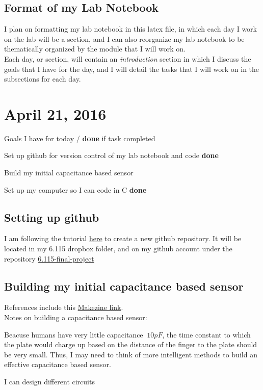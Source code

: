 \documentclass[12pt,twoside]{article}
\newenvironment{tight_enumerate}{
\begin{enumerate}
  \setlength{\itemsep}{0pt}
  \setlength{\parskip}{0pt}
}{\end{enumerate}}
\newenvironment{tight_itemize}{
\begin{itemize}
  \setlength{\itemsep}{0pt}
  \setlength{\parskip}{0pt}
}{\end{itemize}}
\begin{document}
\subsection{Format of my Lab Notebook}
I plan on formatting my lab notebook in this latex file, in which each day I work on the lab will be a section, and I can also reorganize my lab notebook to be thematically organized by the module that I will work on. 
\\ Each day, or section, will contain an {\em introduction} section in which I discuss the goals that I have for the day, and I will detail the tasks that I will work on in the subsections for each day. 


\newpage
\section{April 21, 2016}
Goals I have for today / {\bf done} if task completed
\begin{tight_itemize}
\item Set up github for version control of my lab notebook and code {\bf done}
\item Build my initial capacitance based sensor
\item Set up my computer so I can code in C {\bf done}
\end{tight_itemize}

\subsection{Setting up github}
I am following the tutorial \href{https://help.github.com/articles/adding-an-existing-project-to-github-using-the-command-line/}{here} to create a new github repository. It will be located in my 6.115 dropbox folder, and on my github account under the repository \href{https://github.com/qandrew/6.115-final-project}{6.115-final-project}

\subsection{Building my initial capacitance based sensor}
References include this \href{http://makezine.com/projects/a-touchless-3d-tracking-interface/}{Makezine link}. 
\\ Notes on building a capacitance based sensor:
\begin{tight_enumerate}%
\item Beacuse humans have very little capacitance $~ 10 pF$, the time constant to which the plate would charge up based on the distance of the finger to the plate should be very small. Thus, I may need to think of more intelligent methods to build an effective capacitance based sensor. 
\item I can design different circuits
\end{tight_enumerate}
\end{document}
